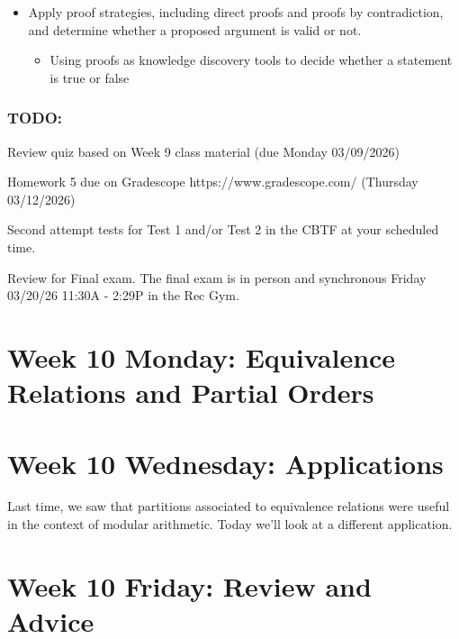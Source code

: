 \begin{itemize}
\item Apply proof strategies, including direct proofs and proofs by contradiction, and determine whether a proposed argument is valid or not.
\begin{itemize}
    \item Using proofs as knowledge discovery tools to decide whether a statement is true or false
\end{itemize}
\end{itemize}

\subsubsection*{TODO:}
\begin{list}
   {\itemsep2pt}
    \item Review quiz based on Week 9 class material (due Monday 03/09/2026)
    \item Homework 5 due on Gradescope https://www.gradescope.com/ (Thursday 03/12/2026)
    \item Second attempt tests for Test 1 and/or Test 2 in the CBTF at your scheduled time.
   \item Review for Final exam. The final exam is in person and synchronous Friday 03/20/26 11:30A - 2:29P  in the Rec Gym.
\end{list}

\newpage
\section*{Week 10 Monday: Equivalence Relations and Partial Orders}

\vfill
\newpage

\newpage
\section*{Week 10 Wednesday: Applications}

Last time, we saw that partitions associated to equivalence relations
were useful in the context of modular arithmetic.
Today we'll look at a different application.




\newpage
\section*{Week 10 Friday: Review and Advice}

\newpage

\newpage

\newpage

\newpage


